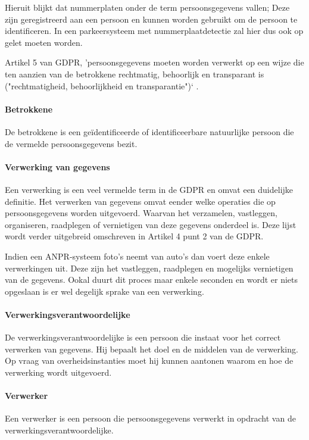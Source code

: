 Hieruit blijkt dat nummerplaten onder de term persoonsgegevens vallen; Deze zijn geregistreerd aan een persoon en kunnen worden gebruikt om de persoon te identificeren. In een parkeersysteem met nummerplaatdetectie zal hier dus ook op gelet moeten worden. 

Artikel 5 van GDPR, 'persoonsgegevens moeten worden verwerkt op een wijze die ten aanzien van de betrokkene rechtmatig, behoorlijk en transparant is ("rechtmatigheid, behoorlijkheid en transparantie")` \autocite{avg2018privacy}.

\paragraph{Betrokkene}
De betrokkene is een geïdentificeerde of identificeerbare natuurlijke persoon die de vermelde persoonsgegevens bezit.

\paragraph{Verwerking van gegevens}
Een verwerking is een veel vermelde term in de GDPR en omvat een duidelijke definitie. Het verwerken van gegevens omvat eender welke operaties die op persoonsgegevens worden uitgevoerd. Waarvan het verzamelen, vastleggen, organiseren, raadplegen of vernietigen van deze gegevens onderdeel is. Deze lijst wordt verder uitgebreid omschreven in Artikel 4 punt 2 van de GDPR.

Indien een ANPR-systeem foto's neemt van auto's dan voert deze enkele verwerkingen uit. Deze zijn het vastleggen, raadplegen en mogelijks vernietigen van de gegevens. Ookal duurt dit proces maar enkele seconden en wordt er niets opgeslaan is er wel degelijk sprake van een verwerking.

\paragraph{Verwerkingsverantwoordelijke}
De verwerkingsverantwoordelijke is een persoon die instaat voor het correct verwerken van gegevens. Hij bepaalt het doel en de middelen van de verwerking. Op vraag van overheidsinstanties moet hij kunnen aantonen waarom en hoe de verwerking wordt uitgevoerd.

\paragraph{Verwerker}
Een verwerker is een persoon die persoonsgegevens verwerkt in opdracht van de verwerkingsverantwoordelijke.

